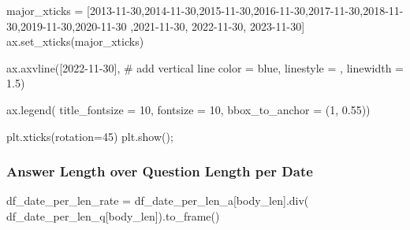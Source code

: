 \documentclass[
  letterpaper,
  DIV=11,
  numbers=noendperiod]{scrartcl}
\newenvironment{Shaded}{\begin{snugshade}}{\end{snugshade}}
\newcommand{\CommentTok}[1]{\textcolor[rgb]{0.37,0.37,0.37}{#1}}
\newcommand{\DecValTok}[1]{\textcolor[rgb]{0.68,0.00,0.00}{#1}}
\newcommand{\FloatTok}[1]{\textcolor[rgb]{0.68,0.00,0.00}{#1}}
\newcommand{\NormalTok}[1]{\textcolor[rgb]{0.00,0.23,0.31}{#1}}
\newcommand{\OperatorTok}[1]{\textcolor[rgb]{0.37,0.37,0.37}{#1}}
\newcommand{\StringTok}[1]{\textcolor[rgb]{0.13,0.47,0.30}{#1}}
\begin{document}
\begin{Shaded}
\begin{Highlighting}[]
\NormalTok{major\_xticks }\OperatorTok{=}\NormalTok{ [}\StringTok{\textquotesingle{}2013{-}11{-}30\textquotesingle{}}\NormalTok{,}\StringTok{\textquotesingle{}2014{-}11{-}30\textquotesingle{}}\NormalTok{,}\StringTok{\textquotesingle{}2015{-}11{-}30\textquotesingle{}}\NormalTok{,}\StringTok{\textquotesingle{}2016{-}11{-}30\textquotesingle{}}\NormalTok{,}\StringTok{\textquotesingle{}2017{-}11{-}30\textquotesingle{}}\NormalTok{,}\StringTok{\textquotesingle{}2018{-}11{-}30\textquotesingle{}}\NormalTok{,}\StringTok{\textquotesingle{}2019{-}11{-}30\textquotesingle{}}\NormalTok{,}\StringTok{\textquotesingle{}2020{-}11{-}30\textquotesingle{}}
\NormalTok{                ,}\StringTok{\textquotesingle{}2021{-}11{-}30\textquotesingle{}}\NormalTok{, }\StringTok{\textquotesingle{}2022{-}11{-}30\textquotesingle{}}\NormalTok{, }\StringTok{\textquotesingle{}2023{-}11{-}30\textquotesingle{}}\NormalTok{]}
\NormalTok{ax.set\_xticks(major\_xticks)}

\NormalTok{ax.axvline([}\StringTok{\textquotesingle{}2022{-}11{-}30\textquotesingle{}}\NormalTok{], }\CommentTok{\# add vertical line}
\NormalTok{           color }\OperatorTok{=} \StringTok{\textquotesingle{}blue\textquotesingle{}}\NormalTok{,}
\NormalTok{           linestyle }\OperatorTok{=} \StringTok{\textquotesingle{}{-}{-}\textquotesingle{}}\NormalTok{,}
\NormalTok{           linewidth }\OperatorTok{=} \FloatTok{1.5}\NormalTok{)}

\NormalTok{ax.legend( title\_fontsize }\OperatorTok{=} \DecValTok{10}\NormalTok{, fontsize }\OperatorTok{=} \DecValTok{10}\NormalTok{,}
\NormalTok{          bbox\_to\_anchor }\OperatorTok{=}\NormalTok{ (}\DecValTok{1}\NormalTok{, }\FloatTok{0.55}\NormalTok{))}

\NormalTok{plt.xticks(rotation}\OperatorTok{=}\DecValTok{45}\NormalTok{)}
\NormalTok{plt.show()}\OperatorTok{;}
\end{Highlighting}
\end{Shaded}

\subsubsection{Answer Length over Question Length per
Date}\label{answer-length-over-question-length-per-date}

\begin{Shaded}
\begin{Highlighting}[]
\NormalTok{df\_date\_per\_len\_rate }\OperatorTok{=}\NormalTok{ df\_date\_per\_len\_a[}\StringTok{\textquotesingle{}body\_len\textquotesingle{}}\NormalTok{].div( df\_date\_per\_len\_q[}\StringTok{\textquotesingle{}body\_len\textquotesingle{}}\NormalTok{]).to\_frame()}
\end{Highlighting}
\end{Shaded}
\end{document}
